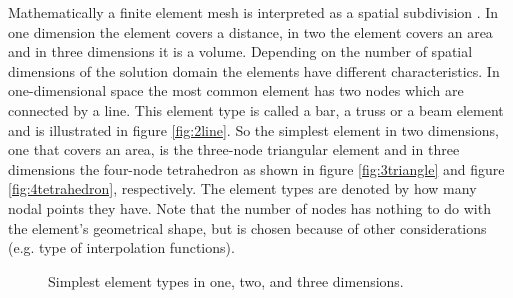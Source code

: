 Mathematically a finite element mesh is interpreted as a spatial
subdivision .
%
In one dimension the element covers a distance, in two the element
covers an area and in three dimensions it is a volume.
%
Depending on the number of spatial dimensions of the solution domain
the elements have different characteristics. In one-dimensional space
the most common element has two nodes which are connected by a
line. This element type is called a bar, a truss or a beam
element and is illustrated in figure \vref{fig:2line}.
%
So the simplest element in two dimensions, one that covers an area, is
the three-node triangular element and in three dimensions the four-node
tetrahedron as shown in figure \ref{fig:3triangle} and figure
\vref{fig:4tetrahedron}, respectively.
%
The element types are denoted by how many nodal points they have.
Note that the number of nodes has nothing to do with the element's
geometrical shape, but is chosen because of other considerations (e.g.
type of interpolation functions).

\begin{figure}
  \centering
  \hspace{10mm}
  \hspace{10mm}
  \caption{Simplest element types in one, two, and three dimensions.}
  \label{fig:simple-elements}
\end{figure}

